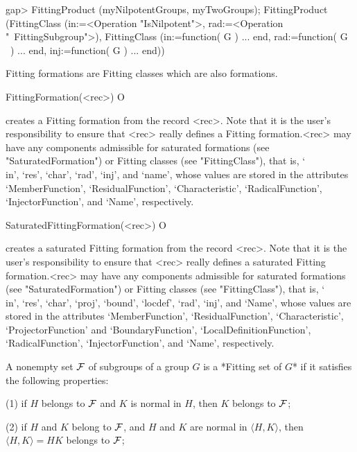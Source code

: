 \beginexample
gap> FittingProduct (myNilpotentGroups, myTwoGroups);
FittingProduct (FittingClass (in:=<Operation "IsNilpotent">, rad:=<Operation "\
FittingSubgroup">), FittingClass (in:=function( G ) ... end, rad:=function( G \
) ... end, inj:=function( G ) ... end))
\endexample


Fitting formations are Fitting classes which are also formations.

\>FittingFormation(<rec>) O

creates a Fitting formation from the record <rec>. Note that it is the user's 
responsibility to ensure that <rec> really defines a Fitting formation.<rec> may 
have any components admissible for saturated formations (see "SaturatedFormation") 
or Fitting classes (see "FittingClass"), that is, `\\in', `res', `char', `rad',
`inj', and `name', 
 whose values are stored in the attributes `MemberFunction',
`ResidualFunction', `Characteristic',  `RadicalFunction',
`InjectorFunction',  and `Name', respectively.

\>SaturatedFittingFormation(<rec>) O

creates a saturated Fitting formation from the record <rec>. Note that it is the user's responsibility to ensure that <rec> really
defines a saturated Fitting formation.<rec> may have any
components admissible for saturated formations (see "SaturatedFormation") or
Fitting classes (see "FittingClass"), that is, `\\in', `res', `char', `proj',
`bound', `locdef', `rad', `inj',  and `Name', whose values are stored in the
attributes `MemberFunction', `ResidualFunction', `Characteristic', 
`ProjectorFunction' and `BoundaryFunction',  `LocalDefinitionFunction',
`RadicalFunction', `InjectorFunction', and `Name', respectively.




A nonempty set $\cal F$ of subgroups of a group $G$ is a *Fitting set of
$G$*  if it satisfies the following properties:

\beginlist
\item{(1)} if $H$ belongs to $\cal F$ and $K$ is normal in $H$, then $K$ 
           belongs to $\cal F$;
         
\item{(2)} if $H$ and $K$ belong to $\cal F$, and $H$ and $K$ are normal in
$\langle H, K \rangle$, then $\langle H, K \rangle = H K$ belongs to $\cal
F$;
         
